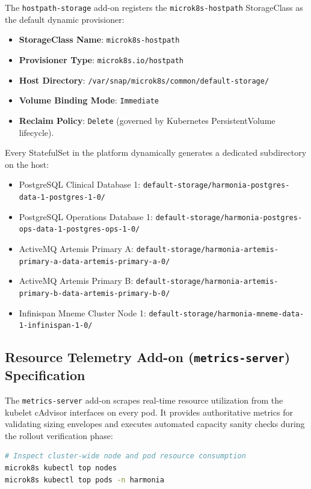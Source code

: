 The \texttt{hostpath-storage} add-on registers the \texttt{microk8s-hostpath} StorageClass as the default dynamic provisioner:
\begin{itemize}
    \item \textbf{StorageClass Name}: \texttt{microk8s-hostpath}
    \item \textbf{Provisioner Type}: \texttt{microk8s.io/hostpath}
    \item \textbf{Host Directory}: \texttt{/var/snap/microk8s/common/default-storage/}
    \item \textbf{Volume Binding Mode}: \texttt{Immediate}
    \item \textbf{Reclaim Policy}: \texttt{Delete} (governed by Kubernetes PersistentVolume lifecycle).
\end{itemize}

Every StatefulSet in the platform dynamically generates a dedicated subdirectory on the host:
\begin{itemize}
    \item PostgreSQL Clinical Database 1: \texttt{default-storage/harmonia-postgres-data-1-postgres-1-0/}
    \item PostgreSQL Operations Database 1: \texttt{default-storage/harmonia-postgres-ops-data-1-postgres-ops-1-0/}
    \item ActiveMQ Artemis Primary A: \texttt{default-storage/harmonia-artemis-primary-a-data-artemis-primary-a-0/}
    \item ActiveMQ Artemis Primary B: \texttt{default-storage/harmonia-artemis-primary-b-data-artemis-primary-b-0/}
    \item Infinispan Mneme Cluster Node 1: \texttt{default-storage/harmonia-mneme-data-1-infinispan-1-0/}
\end{itemize}

\subsection{Resource Telemetry Add-on (\texttt{metrics-server}) Specification}

The \texttt{metrics-server} add-on scrapes real-time resource utilization from the kubelet cAdvisor interfaces on every pod. It provides authoritative metrics for validating sizing envelopes and executes automated capacity sanity checks during the rollout verification phase:
\begin{lstlisting}[language=bash, caption={Resource Telemetry Verification Command}, label={lst:metrics_cli}]
# Inspect cluster-wide node and pod resource consumption
microk8s kubectl top nodes
microk8s kubectl top pods -n harmonia
\end{lstlisting}

